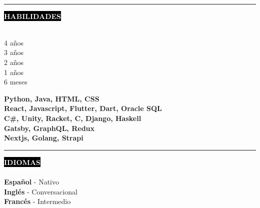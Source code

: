 \documentclass[11pt,A4]{article}
\newcounter{a}
\newcounter{b}
\newcounter{c}
\newcommand{\cvsection}[1] {
	\textcolor{white}{\MakeUppercase{\textbf{#1}}}
}
\newcommand{\cvsect}[1]{
	\colorbox{black}{{\cvsection{#1}}}\\\\%
}
\begin{document}
	\\
	\begin{minipage}[t]{0.65\textwidth}\hrule height 0pt width 0pt%
	\cvsect{Habilidades}
	\begin{minipage}[t]{0.2\textwidth}%
		4 años\\ 3 años\\ 2 años\\ 1 años\\ 6 meses
	\end{minipage}%
	\begin{minipage}[t]{0.7\textwidth}%
		\textbf{Python, Java, HTML, CSS} \\ \textbf{React, Javascript, Flutter, Dart, Oracle SQL} \\ \textbf{C\#, Unity, Racket, C, Django, Haskell} \\ \textbf{Gatsby, GraphQL, Redux} \\ \textbf{Nextjs, Golang, Strapi}
	\end{minipage}%
	\end{minipage}%
	\hspace{1cm}
	\begin{minipage}[t]{0.35\textwidth}\hrule height 0pt width 0pt%
		\cvsect{Idiomas}
		\textbf{Español} - Nativo\\
		\textbf{Inglés} - Conversacional\\
		\textbf{Francés} - Intermedio\\
	\end{minipage}%
\end{document}
